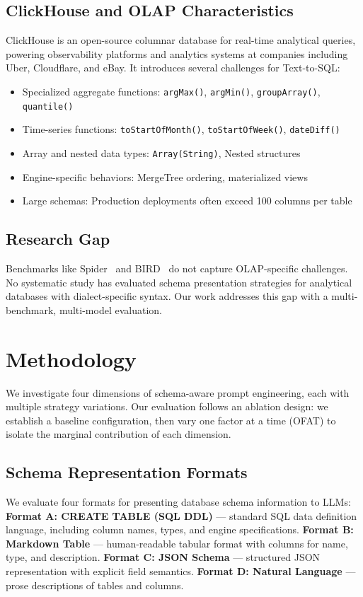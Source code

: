 \documentclass[sigconf, nonacm]{acmart}
\begin{document}
\subsection{ClickHouse and OLAP Characteristics}
ClickHouse is an open-source columnar database for real-time analytical queries, powering observability platforms and analytics systems at companies including Uber, Cloudflare, and eBay. It introduces several challenges for Text-to-SQL:
\begin{itemize}
    \item Specialized aggregate functions: \texttt{argMax()}, \texttt{argMin()}, \texttt{groupArray()}, \texttt{quantile()}
    \item Time-series functions: \texttt{toStartOfMonth()}, \texttt{toStartOfWeek()}, \texttt{dateDiff()}
    \item Array and nested data types: \texttt{Array(String)}, Nested structures
    \item Engine-specific behaviors: MergeTree ordering, materialized views
    \item Large schemas: Production deployments often exceed 100 columns per table
\end{itemize}

\subsection{Research Gap}
Benchmarks like Spider~\cite{yu2018spider} and BIRD~\cite{li2024bird} do not capture OLAP-specific challenges. No systematic study has evaluated schema presentation strategies for analytical databases with dialect-specific syntax. Our work addresses this gap with a multi-benchmark, multi-model evaluation.

\section{Methodology}
\label{sec:methodology}

We investigate four dimensions of schema-aware prompt engineering, each with multiple strategy variations. Our evaluation follows an ablation design: we establish a baseline configuration, then vary one factor at a time (OFAT) to isolate the marginal contribution of each dimension.

\subsection{Schema Representation Formats}
We evaluate four formats for presenting database schema information to LLMs:
\textbf{Format A: CREATE TABLE (SQL DDL)} --- standard SQL data definition language, including column names, types, and engine specifications.
\textbf{Format B: Markdown Table} --- human-readable tabular format with columns for name, type, and description.
\textbf{Format C: JSON Schema} --- structured JSON representation with explicit field semantics.
\textbf{Format D: Natural Language} --- prose descriptions of tables and columns.
\end{document}
